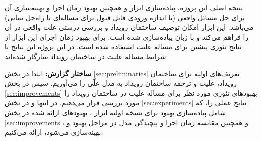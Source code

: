 نتیجه اصلی این پروژه، پیاده‌سازی ابزار
و همچنین بهبود زمان اجرا و بهینه‌سازی آن برای
حل مسائل واقعی
(با اندازه ورودی قابل قبول برای
مساله‌ای با راه‌حل نمایی)
می‌باشد.
این ابزار امکان توصیف ساختمان رویداد
و بررسی درستی علت واقعی در آن را فراهم می‌کند
و با زبان
پیاده‌سازی شده است.
برای بهبود زمان اجرای این ابزار از
نتایج تئوری پیشین برای مساله علیت استفاده شده است.
در این پروژه این نتایج با شرایط مساله علیت
در ساختمان رویداد سازگار شده‌اند.

\textbf{ساختار گزارش:}
ابتدا در بخش‌
\ref{sec:preliminaries}
تعریف‌های اولیه برای
ساختمان رویداد، علیت و
ترجمه ساختمان رویداد به مدل علّی
را می‌آوریم.
سپس در بخش
\ref{sec:improvements}
بهبودهای تئوری مورد نظر برای مساله
علیت در ساختمان رویداد را مورد بررسی قرار می‌دهیم.
در انتها و در بخش
\ref{sec:experiments}
نتایج عملی را، که شامل
پیاده‌سازی بهبود برای نسخه اولیه ابزار
،
بهبودهای ارائه شده در بخش
\ref{sec:improvements}،
و همچنین مقایسه زمان اجرا و پیچیدگی مدل
در مراحل بهبود و بهینه‌سازی
می‌شود،
ارائه می‌کنیم.
